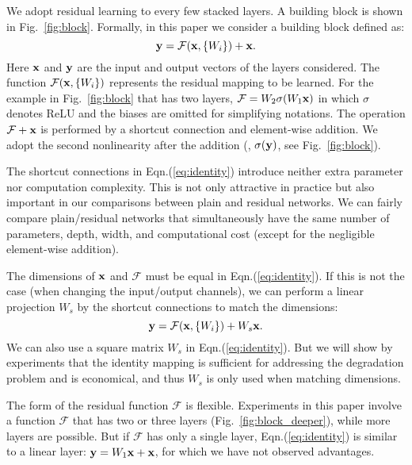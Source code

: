 We adopt residual learning to every few stacked layers.
A building block is shown in Fig.~\ref{fig:block}. Formally, in this paper we consider a building block defined as:
\begin{equation}\label{eq:identity}
\mathbf{y}= \mathcal{F}(\mathbf{x}, \{W_{i}\}) + \mathbf{x}.
\end{equation}
Here $\mathbf{x}$ and $\mathbf{y}$ are the input and output vectors of the layers considered. The function $\mathcal{F}(\mathbf{x}, \{W_{i}\})$ represents the residual mapping to be learned. For the example in Fig.~\ref{fig:block} that has two layers, $\mathcal{F}=W_{2}\sigma(W_{1}\mathbf{x})$ in which $\sigma$ denotes ReLU \cite{Nair2010} and the biases are omitted for simplifying notations. The operation $\mathcal{F}+\mathbf{x}$ is performed by a shortcut connection and element-wise addition. We adopt the second nonlinearity after the addition (\ie, $\sigma(\mathbf{y})$, see Fig.~\ref{fig:block}).

The shortcut connections in Eqn.(\ref{eq:identity}) introduce neither extra parameter nor computation complexity. This is not only attractive in practice but also important in our comparisons between plain and residual networks. We can fairly compare plain/residual networks that simultaneously have the same number of parameters, depth, width, and computational cost (except for the negligible element-wise addition).

The dimensions of $\mathbf{x}$ and $\mathcal{F}$ must be equal in Eqn.(\ref{eq:identity}). If this is not the case (when changing the input/output channels), we can perform a linear projection $W_{s}$ by the shortcut connections to match the dimensions:
\begin{equation}\label{eq:transform}
\mathbf{y}= \mathcal{F}(\mathbf{x}, \{W_{i}\}) + W_{s}\mathbf{x}.
\end{equation}
We can also use a square matrix $W_{s}$ in Eqn.(\ref{eq:identity}). But we will show by experiments that the identity mapping is sufficient for addressing the degradation problem and is economical, and thus $W_{s}$ is only used when matching dimensions.

The form of the residual function $\mathcal{F}$ is flexible. Experiments in this paper involve a function $\mathcal{F}$ that has two or three layers (Fig.~\ref{fig:block_deeper}), while more layers are possible. But if $\mathcal{F}$ has only a single layer, Eqn.(\ref{eq:identity}) is similar to a linear layer: $\mathbf{y}=W_1\mathbf{x}+\mathbf{x}$, for which we have not observed advantages.

